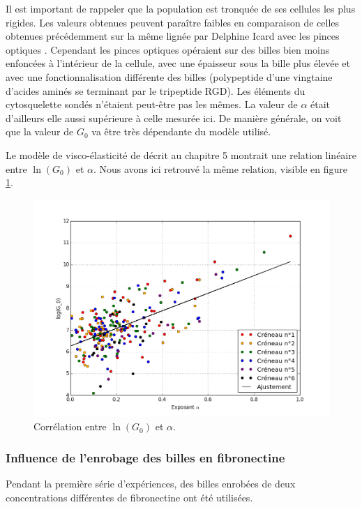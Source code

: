   
Il est important de rappeler que la population est tronquée de ses cellules les plus rigides. 
Les valeurs obtenues peuvent paraître faibles en comparaison de celles obtenues précédemment sur la même lignée par Delphine Icard avec les pinces optiques \cite{icard-arcizet_cell_2008}. Cependant les pinces optiques opéraient sur des billes bien moins enfoncées à l'intérieur de la cellule, avec une épaisseur sous la bille plus élevée et avec une fonctionnalisation différente des billes (polypeptide d’une vingtaine d’acides aminés se terminant par le tripeptide RGD). Les éléments du cytosquelette sondés n’étaient peut-être pas les mêmes. La valeur de $\alpha$ était d’ailleurs elle aussi supérieure à celle mesurée ici. De manière générale, on voit que la valeur de $G_0$ va être très dépendante du modèle utilisé. 

Le modèle de visco-élasticité de \cite{balland_power_2006} décrit au chapitre 5 montrait une relation linéaire entre $\ln(G_0)$ et $\alpha$. Nous avons ici retrouvé la même relation, visible en figure \ref{lnG0}. 

\begin{figure}
\includegraphics[scale=0.4]{Figures/lnG0_vs_alpha.png} 
\caption{Corrélation entre $\ln(G_0)$ et $\alpha$.\label{lnG0}}
\end{figure}


\subsubsection{Influence de l'enrobage des billes en fibronectine}

Pendant la première série d'expériences, des billes enrobées de deux concentrations différentes de fibronectine ont été utilisées. 

